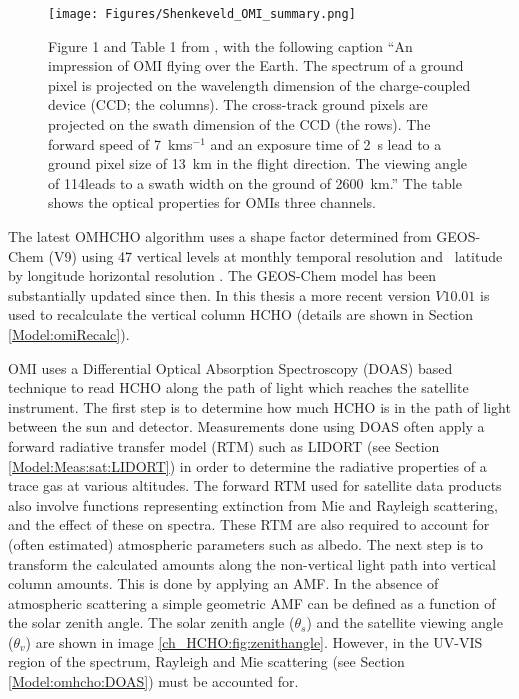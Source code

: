   \begin{figure}
    \texttt{[image: Figures/Shenkeveld\_OMI\_summary.png]}
    \caption{ %
      Figure 1 and Table 1 from \textcite{Schenkeveld2017}, with the following caption ``An impression of OMI flying over the Earth.
      The spectrum of a ground pixel is projected on the wavelength dimension of the charge-coupled device (CCD; the columns). 
      The cross-track ground pixels are projected on the swath dimension of the CCD (the rows).
      The forward speed of 7~kms$^{-1}$ and an exposure time of 2~s lead to a ground pixel size of 13~km in the flight direction.
      The viewing angle of 114\degr leads to a swath width on the ground of 2600~km.''
      The table shows the optical properties for OMIs three channels.}
    \label{LR:HCHO:Sat:fig_Shenkeveld_OMI_summary}
  \end{figure}
  
  The latest OMHCHO algorithm uses a shape factor determined from GEOS-Chem (V9) using 47 vertical levels at monthly temporal resolution and \lowhr ~latitude by longitude horizontal resolution \parencite{Abad2015}.
  The GEOS-Chem model has been substantially updated since then.
  In this thesis a more recent version $V10.01$ is used to recalculate the vertical column HCHO (details are shown in Section \ref{Model:omiRecalc}).
  
  OMI uses a Differential Optical Absorption Spectroscopy (DOAS) based technique to read HCHO along the path of light which reaches the satellite instrument.
  The first step is to determine how much HCHO is in the path of light between the sun and detector.
  Measurements done using DOAS often apply a forward radiative transfer model (RTM) such as LIDORT (see Section \ref{Model:Meas:sat:LIDORT}) in order to determine the radiative properties of a trace gas at various altitudes.
  The forward RTM used for satellite data products also involve functions representing extinction from Mie and Rayleigh scattering, and the effect of these on spectra.
  These RTM are also required to account for (often estimated) atmospheric parameters such as albedo.
  The next step is to transform the calculated amounts along the non-vertical light path into vertical column amounts.
  This is done by applying an AMF.
  In the absence of atmospheric scattering a simple geometric AMF can be defined as a function of the solar zenith angle. 
  The solar zenith angle ($\theta_s$) and the satellite viewing angle ($\theta_v$) are shown in image \ref{ch_HCHO:fig:zenithangle}.
  However, in the UV-VIS region of the spectrum, Rayleigh and Mie scattering (see Section \ref{Model:omhcho:DOAS}) must be accounted for.
  
